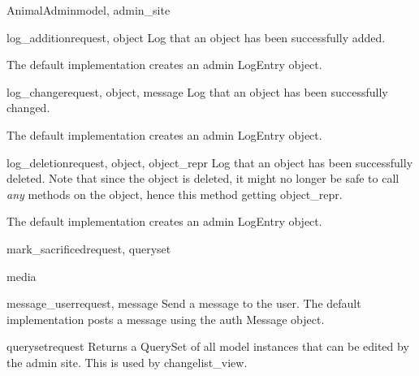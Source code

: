 \documentclass[letterpaper,10pt,english]{sphinxmanual}
\begin{document}
\begin{classdesc}{AnimalAdmin}{model, admin\_site}
\hypertarget{animal.admin.AnimalAdmin.log_addition}{}\begin{methoddesc}{log\_addition}{request, object}
Log that an object has been successfully added.

The default implementation creates an admin LogEntry object.
\end{methoddesc}

\hypertarget{animal.admin.AnimalAdmin.log_change}{}\begin{methoddesc}{log\_change}{request, object, message}
Log that an object has been successfully changed.

The default implementation creates an admin LogEntry object.
\end{methoddesc}

\hypertarget{animal.admin.AnimalAdmin.log_deletion}{}\begin{methoddesc}{log\_deletion}{request, object, object\_repr}
Log that an object has been successfully deleted. Note that since the
object is deleted, it might no longer be safe to call \emph{any} methods
on the object, hence this method getting object\_repr.

The default implementation creates an admin LogEntry object.
\end{methoddesc}

\hypertarget{animal.admin.AnimalAdmin.mark_sacrificed}{}\begin{methoddesc}{mark\_sacrificed}{request, queryset}\end{methoddesc}

\hypertarget{animal.admin.AnimalAdmin.media}{}\begin{memberdesc}{media}\end{memberdesc}

\hypertarget{animal.admin.AnimalAdmin.message_user}{}\begin{methoddesc}{message\_user}{request, message}
Send a message to the user. The default implementation
posts a message using the auth Message object.
\end{methoddesc}

\hypertarget{animal.admin.AnimalAdmin.queryset}{}\begin{methoddesc}{queryset}{request}
Returns a QuerySet of all model instances that can be edited by the
admin site. This is used by changelist\_view.
\end{methoddesc}


\end{classdesc}
\end{document}
